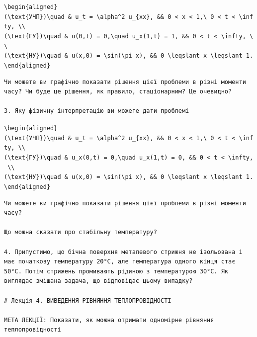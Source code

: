 \documentclass[
  ukrainian,
]{article}
\begin{document}
\texttt{\textbackslash{}begin\{aligned\}}
\texttt{(\textbackslash{}text\{УЧП\})\textbackslash{}quad\ \&\ u\_t\ =\ \textbackslash{}alpha\^{}2\ u\_\{xx\},\ \&\&\ 0\ \textless{}\ x\ \textless{}\ 1,\textbackslash{}\ 0\ \textless{}\ t\ \textless{}\ \textbackslash{}infty,\ \textbackslash{}\textbackslash{}}
\texttt{(\textbackslash{}text\{ГУ\})\textbackslash{}quad\ \&\ u(0,t)\ =\ 0,\textbackslash{}quad\ u\_x(1,t)\ =\ 1,\ \&\&\ 0\ \textless{}\ t\ \textless{}\ \textbackslash{}infty,\ \textbackslash{}\textbackslash{}}
\texttt{(\textbackslash{}text\{НУ\})\textbackslash{}quad\ \&\ u(x,0)\ =\ \textbackslash{}sin(\textbackslash{}pi\ x),\ \&\&\ 0\ \textbackslash{}leqslant\ x\ \textbackslash{}leqslant\ 1.}
\texttt{\textbackslash{}end\{aligned\}}

\begin{verbatim}
Чи можете ви графічно показати рішення цієї проблеми в різні моменти часу? Чи буде це рішення, як правило, стаціонарним? Це очевидно?

3. Яку фізичну інтерпретацію ви можете дати проблемі
\end{verbatim}

\texttt{\textbackslash{}begin\{aligned\}}
\texttt{(\textbackslash{}text\{УЧП\})\textbackslash{}quad\ \&\ u\_t\ =\ \textbackslash{}alpha\^{}2\ u\_\{xx\},\ \&\&\ 0\ \textless{}\ x\ \textless{}\ 1,\textbackslash{}\ 0\ \textless{}\ t\ \textless{}\ \textbackslash{}infty,\ \textbackslash{}\textbackslash{}}
\texttt{(\textbackslash{}text\{ГУ\})\textbackslash{}quad\ \&\ u\_x(0,t)\ =\ 0,\textbackslash{}quad\ u\_x(1,t)\ =\ 0,\ \&\&\ 0\ \textless{}\ t\ \textless{}\ \textbackslash{}infty,\ \textbackslash{}\textbackslash{}}
\texttt{(\textbackslash{}text\{НУ\})\textbackslash{}quad\ \&\ u(x,0)\ =\ \textbackslash{}sin(\textbackslash{}pi\ x),\ \&\&\ 0\ \textbackslash{}leqslant\ x\ \textbackslash{}leqslant\ 1.}
\texttt{\textbackslash{}end\{aligned\}}

\begin{verbatim}
Чи можете ви графічно показати рішення цієї проблеми в різні моменти часу?

Що можна сказати про стабільну температуру?

4. Припустимо, що бічна поверхня металевого стрижня не ізольована і має початкову температуру 20°C, але температура одного кінця стає 50°C. Потім стрижень промивають рідиною з температурою 30°C. Як виглядає змішана задача, що відповідає цьому випадку?

# Лекція 4. ВИВЕДЕННЯ РІВНЯННЯ ТЕПЛОПРОВІДНОСТІ

МЕТА ЛЕКЦІЇ: Показати, як можна отримати одномірне рівняння теплопровідності
\end{verbatim}
\end{document}
